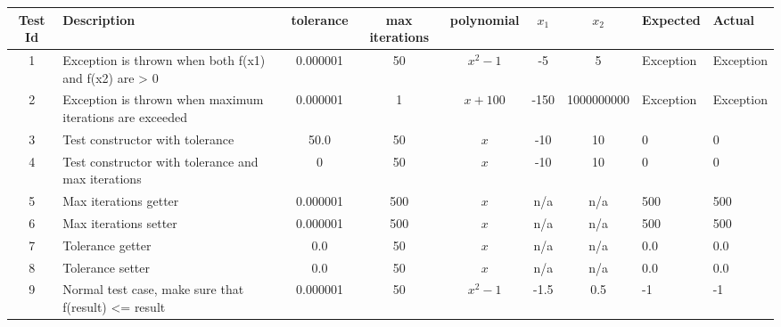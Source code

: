 \begin{adjustbox}{width=0.9\paperwidth, center}
	\begin{tabular}{clcccccll}
		Test Id & Description                                              & tolerance & max iterations & polynomial & $x_1$ & $x_2$      & Expected  & Actual    \\ \hline
		1       & Exception is thrown when both f(x1) and f(x2) are > 0    & 0.000001  & 50             & $x^2 - 1$  & -5    & 5          & Exception & Exception \\
		2       & Exception is thrown when maximum iterations are exceeded & 0.000001  & 1              & $x+100$    & -150  & 1000000000 & Exception & Exception \\
		3       & Test constructor with tolerance                          & 50.0      & 50             & $x$        & -10   & 10         & 0         & 0         \\
		4       & Test constructor with tolerance and max iterations       & 0         & 50             & $x$        & -10   & 10         & 0         & 0         \\
		5       & Max iterations getter                                    & 0.000001  & 500            & $x$        & n/a   & n/a        & 500       & 500       \\
		6       & Max iterations setter                                    & 0.000001  & 500            & $x$        & n/a   & n/a        & 500       & 500       \\
		7       & Tolerance getter                                         & 0.0       & 50             & $x$        & n/a   & n/a        & 0.0       & 0.0       \\
		8       & Tolerance setter                                         & 0.0       & 50             & $x$        & n/a   & n/a        & 0.0       & 0.0       \\
		9       & Normal test case, make sure that f(result) <= result     & 0.000001  & 50             & $x^2 -1$   & -1.5  & 0.5        & -1        & -1
	\end{tabular}%
\end{adjustbox}

